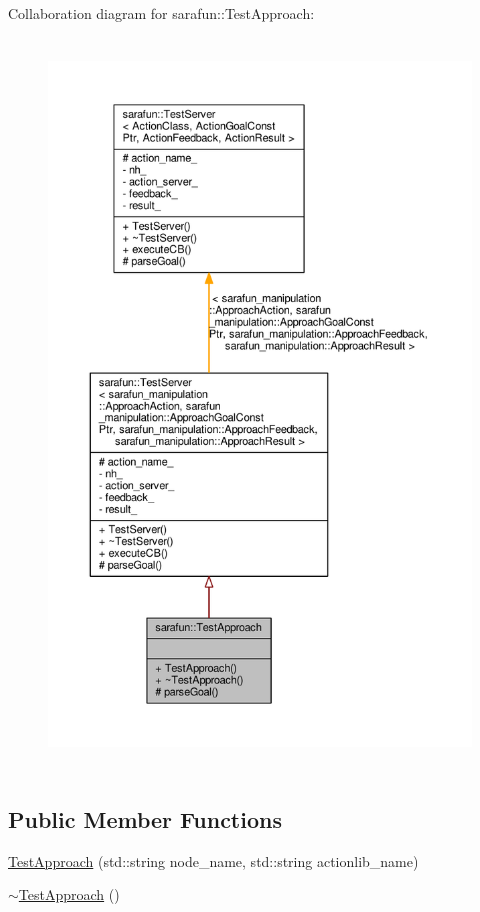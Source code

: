 Collaboration diagram for sarafun\-:\-:Test\-Approach\-:
\nopagebreak
\begin{figure}[H]
\begin{center}
\leavevmode
\includegraphics[height=550pt]{d1/d01/classsarafun_1_1TestApproach__coll__graph}
\end{center}
\end{figure}
\subsection*{Public Member Functions}
\begin{DoxyCompactItemize}
\item 
\hyperlink{classsarafun_1_1TestApproach_aebd82243594c941ecceb4f73b44d4139_aebd82243594c941ecceb4f73b44d4139}{Test\-Approach} (std\-::string node\-\_\-name, std\-::string actionlib\-\_\-name)
\item 
\hyperlink{classsarafun_1_1TestApproach_a5a261f65818ad6ee669b75573811c31f_a5a261f65818ad6ee669b75573811c31f}{$\sim$\-Test\-Approach} ()
\end{DoxyCompactItemize}

